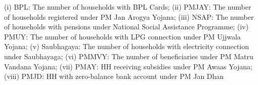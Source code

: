 \begin{table}[!htbp]
\begin{threeparttable}
\begin{tablenotes}[flushleft]
                   (i) BPL: The number of households with BPL Cards;
                   (ii) PMJAY: The number of households registered under PM Jan Arogya Yojana;
                   (iii) NSAP: The number of households with pensions under National Social Assistance Programme;
                   (iv) PMUY: The number of households with LPG connection under PM Ujjwala Yojana;
                   (v) Saubhagaya: The number of households with electricity connection under Saubhayaga;
                   (vi) PMMVY: The number of beneficiaries under PM Matru Vandana Yojana;
                   (vii) PMAY: HH receiving subsidies under PM Awaas Yojana;
                   (viii) PMJD: HH with zero-balance bank account under PM Jan Dhan
\end{tablenotes}
\end{threeparttable}
\end{table}
